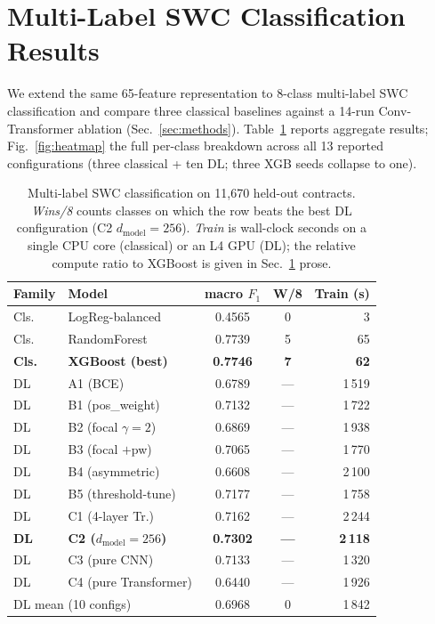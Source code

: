\documentclass[twocolumn, 10pt]{article}
\begin{document}
\section{Multi-Label SWC Classification Results}\label{sec:ml-results}

We extend the same 65-feature representation to 8-class multi-label
SWC classification and compare three classical baselines against a
14-run Conv-Transformer ablation (Sec.~\ref{sec:methods}).
Table~\ref{tab:ml} reports aggregate results; Fig.~\ref{fig:heatmap}
the full per-class breakdown across all 13 reported configurations
(three classical + ten DL; three XGB seeds collapse to one).

\begin{table}[t]
\centering
\caption{Multi-label SWC classification on 11{,}670 held-out
contracts. \emph{Wins/8} counts classes on which the row beats the
best DL configuration (C2 $d_\text{model}\!=\!256$). \emph{Train}
is wall-clock seconds on a single CPU core (classical) or an L4 GPU
(DL); the relative compute ratio to XGBoost is given in
Sec.~\ref{sec:ml-results} prose.}
\label{tab:ml}
\setlength{\tabcolsep}{4pt}
\footnotesize
\begin{tabular}{llccr}
\toprule
Family & Model & macro $F_1$ & W/8 & Train (s) \\
\midrule
Cls. & LogReg-balanced     & 0.4565 & 0 &     3 \\
Cls. & RandomForest         & 0.7739 & 5 &    65 \\
\textbf{Cls.} & \textbf{XGBoost (best)} & \textbf{0.7746} &
                              \textbf{7} & \textbf{62} \\
\midrule
DL & A1 (BCE)               & 0.6789 & --- & 1\,519 \\
DL & B1 (pos\_weight)        & 0.7132 & --- & 1\,722 \\
DL & B2 (focal $\gamma\!=\!2$)& 0.6869 & --- & 1\,938 \\
DL & B3 (focal $+$pw)         & 0.7065 & --- & 1\,770 \\
DL & B4 (asymmetric)          & 0.6608 & --- & 2\,100 \\
DL & B5 (threshold-tune)      & 0.7177 & --- & 1\,758 \\
DL & C1 (4-layer Tr.)         & 0.7162 & --- & 2\,244 \\
\textbf{DL} & \textbf{C2 ($d_\text{model}\!=\!256$)} &
        \textbf{0.7302} & \textbf{---} & \textbf{2\,118} \\
DL & C3 (pure CNN)            & 0.7133 & --- & 1\,320 \\
DL & C4 (pure Transformer)    & 0.6440 & --- & 1\,926 \\
\midrule
\multicolumn{2}{l}{DL mean (10 configs)} & 0.6968 & 0 & 1\,842 \\
\bottomrule
\end{tabular}
\end{table}
\end{document}
